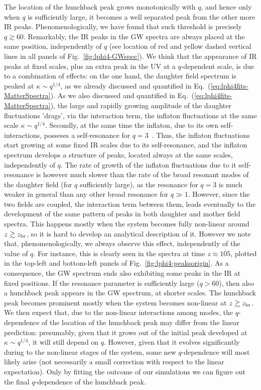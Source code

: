\documentclass[a4paper,11pt]{article}
\begin{document}
The location of the hunchback peak grows monotonically with $q$, and hence only when $q$ is sufficiently large, it becomes a well separated peak from the other more IR peaks. Phenomenologically, we have found that such threshold is precisely $q \gtrsim 60$. Remarkably, the IR peaks in the GW spectra are always placed at the same position, independently of $q$ (see location of red and yellow dashed vertical lines in all panels of Fig.~\ref{fig:lphi4-GWspec}). We think that the appearance of IR peaks at fixed scales, plus an extra peak in the UV at a $q$-dependent scale, is due to a combination of effects: on the one hand, the daughter field spectrum is peaked at $\kappa \sim q^{1/4}$, as we already discussed and quantified in Eq.~(\ref{eq:lphi4fits-MatterSpectra}). As we also discussed and quantified in Eq.~(\ref{eq:lphi4fits-MatterSpectra}), the large and rapidly growing amplitude of the daughter fluctuations 'drags', via the interaction term, the inflaton fluctuations at the same scale $\kappa \sim q^{1/4}$. Secondly, at the same time the inflaton, due to its own self-interactions, posseses a self-resonance for $q = 3$~\cite{Greene:1997fu}. Thus, the inflaton fluctuations start growing at some fixed IR scales due to its self-resonance, and the inflaton spectrum develops a structure of peaks, located always at the same scales, independently of $q$. The rate of growth of the inflaton fluctuations due to it self-resonance is however much slower than the rate of the broad resonant modes of the daughter field (for $q$ sufficiently large), as the resonance for $q = 3$ is much weaker in general than any other broad resonance for $q \gg 1$. However, since the two fields are coupled, the interaction term between them, leads eventually to the development of the same pattern of peaks in both daughter and mother field spectra. This happens mostly when the system becomes fully non-linear around $z \gtrsim z_{\rm br}$, so it is hard to develop an analytical description of it. However we note that, phenomenologically, we always observe this effect, independently of the value of $q$. For instance, this is clearly seen in the spectra at time $z \approx 105$, plotted in the top-left and bottom-left panels of Fig.~\ref{fig:lphi4-peaksorigin}. As a consequence, the GW spectrum ends also exhibiting some peaks in the IR at fixed positions. If the resonance parameter is sufficiently large ($q > 60$), then also a hunchback peak appears in the GW spectrum, at shorter scales. The hunchback peak becomes prominent mostly when the system becomes non-linear at $z \gtrsim z_{\rm br}$. We then expect that, due to the non-linear interactions among modes, the $q$-dependence of the location of the hunchback peak may differ from the linear prediction: presumably, given that it grows out of the initial peak developed at $\kappa \sim q^{1/4}$, it will still depend on $q$. However, given that it evolves significantly during to the non-linear stages of the system, some new $q$-dependence will most likely arise (not necessarily a small correction with respect to the linear expectation). Only by fitting the outcome of our simulations we can figure out the final $q$-dependence of the hunchback peak. 
\end{document}
